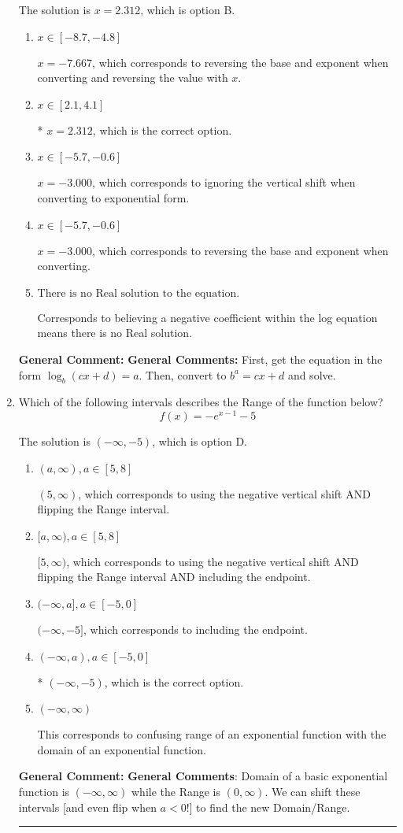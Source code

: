 \documentclass{extbook}[14pt]
\newcommand{\litem}[1]{\item #1

\rule{\textwidth}{0.4pt}}
\begin{document}
\begin{enumerate}
{The solution is \( x = 2.312 \), which is option B.\begin{enumerate}[label=\Alph*.]
\item \( x \in [-8.7, -4.8] \)

$x = -7.667$, which corresponds to reversing the base and exponent when converting and reversing the value with $x$.
\item \( x \in [2.1, 4.1] \)

* $x = 2.312$, which is the correct option.
\item \( x \in [-5.7, -0.6] \)

$x = -3.000$, which corresponds to ignoring the vertical shift when converting to exponential form.
\item \( x \in [-5.7, -0.6] \)

$x = -3.000$, which corresponds to reversing the base and exponent when converting.
\item \( \text{There is no Real solution to the equation.} \)

Corresponds to believing a negative coefficient within the log equation means there is no Real solution.
\end{enumerate}

\textbf{General Comment:} \textbf{General Comments:} First, get the equation in the form $\log_b{(cx+d)} = a$. Then, convert to $b^a = cx+d$ and solve.
}
\litem{
Which of the following intervals describes the Range of the function below?
\[ f(x) = -e^{x-1}-5 \]

The solution is \( (-\infty, -5) \), which is option D.\begin{enumerate}[label=\Alph*.]
\item \( (a, \infty), a \in [5, 8] \)

$(5, \infty)$, which corresponds to using the negative vertical shift AND flipping the Range interval.
\item \( [a, \infty), a \in [5, 8] \)

$[5, \infty)$, which corresponds to using the negative vertical shift AND flipping the Range interval AND including the endpoint.
\item \( (-\infty, a], a \in [-5, 0] \)

$(-\infty, -5]$, which corresponds to including the endpoint.
\item \( (-\infty, a), a \in [-5, 0] \)

* $(-\infty, -5)$, which is the correct option.
\item \( (-\infty, \infty) \)

This corresponds to confusing range of an exponential function with the domain of an exponential function.
\end{enumerate}

\textbf{General Comment:} \textbf{General Comments}: Domain of a basic exponential function is $(-\infty, \infty)$ while the Range is $(0, \infty)$. We can shift these intervals [and even flip when $a<0$!] to find the new Domain/Range.
}
\end{enumerate}
\end{document}
